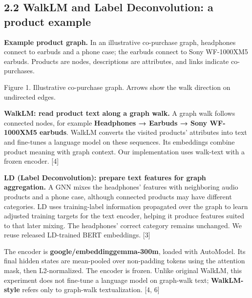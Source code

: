 \documentclass[10pt]{article}
\begin{document}
\subsection*{2.2 WalkLM and Label Deconvolution: a product example}

\textbf{Example product graph.} In an illustrative co-purchase graph, headphones connect to earbuds and a phone case; the earbuds connect to Sony WF-1000XM5 earbuds. Products are nodes, descriptions are attributes, and links indicate co-purchases.\par

\begin{center}
\end{center}
{\small Figure 1. Illustrative co-purchase graph. Arrows show the walk direction on undirected edges.\par}

\textbf{WalkLM: read product text along a graph walk.} A graph walk follows connected nodes, for example \textbf{Headphones → Earbuds → Sony WF-1000XM5 earbuds}. WalkLM converts the visited products' attributes into text and fine-tunes a language model on these sequences. Its embeddings combine product meaning with graph context. Our implementation uses walk-text with a frozen encoder. [4]\par

\textbf{LD (Label Deconvolution): prepare text features for graph aggregation.} A GNN mixes the headphones' features with neighboring audio products and a phone case, although connected products may have different categories. LD uses training-label information propagated over the graph to learn adjusted training targets for the text encoder, helping it produce features suited to that later mixing. The headphones' correct category remains unchanged. We reuse released LD-trained BERT embeddings. [3]\par

The encoder is \textbf{google/embeddinggemma-300m}, loaded with AutoModel. Its final hidden states are mean-pooled over non-padding tokens using the attention mask, then L2-normalized. The encoder is frozen. Unlike original WalkLM, this experiment does not fine-tune a language model on graph-walk text; \textbf{WalkLM-style} refers only to graph-walk textualization. [4, 6]\par
\end{document}
